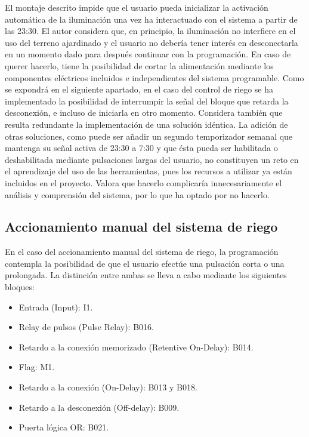 El montaje descrito impide que el usuario pueda inicializar la activaci\'on autom\'atica de la iluminaci\'on una vez ha interactuado con el sistema a partir de las 23:30. El autor considera que, en principio, la iluminaci\'on no interfiere en el uso del terreno ajardinado y el usuario no deber\'ia tener inter\'es en desconectarla en un momento dado para despu\'es continuar con la programaci\'on. En caso de querer hacerlo, tiene la posibilidad de cortar la alimentaci\'on mediante los componentes el\'ectricos incluidos e independientes del sistema programable. Como se expondr\'a en el siguiente apartado, en el caso del control de riego se ha implementado la posibilidad de interrumpir la señal del bloque que retarda la desconexi\'on, e incluso de iniciarla en otro momento. Considera tambi\'en que resulta redundante la implementaci\'on de una soluci\'on id\'entica. La adici\'on de otras soluciones, como puede ser añadir un segundo temporizador semanal que mantenga su señal activa de 23:30 a 7:30 y que \'esta pueda ser habilitada o deshabilitada mediante pulsaciones largas del usuario, no constituyen un reto en el aprendizaje del uso de las herramientas, pues los recursos a utilizar ya est\'an incluidos en el proyecto. Valora que hacerlo complicar\'ia innecesariamente el an\'alisis y comprensi\'on del sistema, por lo que ha optado por no hacerlo.

\subsection{Accionamiento manual del sistema de riego}

En el caso del accionamiento manual del sistema de riego, la programaci\'on contempla la posibilidad de que el usuario efect\'ue una pulsaci\'on corta o una prolongada. La distinci\'on entre ambas se lleva a cabo mediante los siguientes bloques:

\begin{itemize}
 \item Entrada (Input): I1.
 \item Relay de pulsos (Pulse Relay): B016.
 \item Retardo a la conexi\'on memorizado (Retentive On-Delay): B014.
 \item Flag: M1.
 \item Retardo a la conexi\'on (On-Delay): B013 y B018.
 \item Retardo a la desconexi\'on (Off-delay): B009.
 \item Puerta l\'ogica OR: B021.
\end{itemize}

